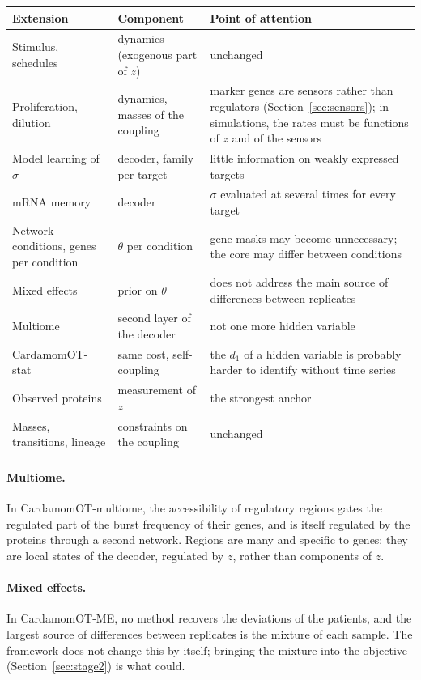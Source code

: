 \documentclass[a4paper, 11pt]{article}
\theoremstyle{plain}
\theoremstyle{remark}
\begin{document}
\begin{center}
\begin{tabular}{@{}p{}p{}p{}@{}}
\toprule
Extension & Component & Point of attention \\
\midrule
Stimulus, schedules & dynamics (exogenous part of $z$) & unchanged \\
Proliferation, dilution & dynamics, masses of the coupling & marker genes are sensors rather than regulators (Section~\ref{sec:sensors}); in simulations, the rates must be functions of $z$ and of the sensors \\
Model learning of $\sigma$ & decoder, family per target & little information on weakly expressed targets \\
mRNA memory & decoder & $\sigma$ evaluated at several times for every target \\
Network conditions, genes per condition & $\theta$ per condition & gene masks may become unnecessary; the core may differ between conditions \\
Mixed effects & prior on $\theta$ & does not address the main source of differences between replicates \\
Multiome & second layer of the decoder & not one more hidden variable \\
CardamomOT-stat & same cost, self-coupling & the $d_1$ of a hidden variable is probably harder to identify without time series \\
Observed proteins & measurement of $z$ & the strongest anchor \\
Masses, transitions, lineage & constraints on the coupling & unchanged \\
\bottomrule
\end{tabular}
\end{center}

\paragraph{Multiome.} In CardamomOT-multiome, the accessibility of regulatory regions gates the regulated part of the burst frequency of their genes, and is itself regulated by the proteins through a second network. Regions are many and specific to genes: they are local states of the decoder, regulated by $z$, rather than components of $z$.

\paragraph{Mixed effects.} In CardamomOT-ME, no method recovers the deviations of the patients, and the largest source of differences between replicates is the mixture of each sample. The framework does not change this by itself; bringing the mixture into the objective (Section~\ref{sec:stage2}) is what could.
\end{document}
